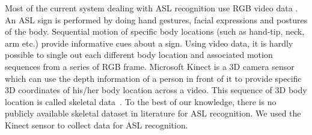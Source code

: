 \documentclass[10pt,twocolumn,letterpaper]{article}
\begin{document}

Most of the current system dealing with ASL recognition use RGB video data \cite{7177428,Ji:2013:CNN:2412386.2412939,Sun:2015:LSV:2753829.2629481}. An ASL sign is performed by doing hand gestures, facial expressions and postures of the body. Sequential motion of specific body locations (such as hand-tip, neck, arm etc.) provide informative cues about a sign.
Using video data, it is hardly possible to single out each different body location and associated motion sequences from a series of RGB frame. Microsoft Kinect is a 3D camera sensor which can use the depth information of a person in front of it to provide specific 3D coordinates of his/her body location across a video. This sequence of 3D body location is called skeletal data~\cite{Zhang:2012:MKS:2225053.2225203}. 
To the best of our knowledge, there is no publicly available skeletal dataset in literature for ASL recognition. We used the Kinect sensor to collect data for ASL recognition. 
\end{document}
